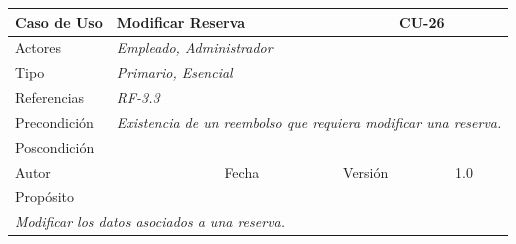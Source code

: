 \begin{table}[H]
    \begin{tabular}{|llllllll|}
    \hline
    \multicolumn{1}{|l|}{Caso de Uso}       & \multicolumn{5}{l|}{Modificar Reserva}                                                                          & \multicolumn{2}{l|}{\cellcolor[HTML]{E6E6E6}CU-26}          \\ \hline
    \multicolumn{1}{|l|}{Actores}           & \multicolumn{7}{l|}{{\color[HTML]{808080} \textit{Empleado, Administrador}}}                                                                                                                           \\ \hline
    \multicolumn{1}{|l|}{Tipo}              & \multicolumn{7}{l|}{{\color[HTML]{808080} \textit{Primario, Esencial}}}                                                                                                                \\ \hline
    \multicolumn{1}{|l|}{Referencias}       & \multicolumn{2}{l|}{{\color[HTML]{808080} \textit{RF-3.3}}}              & \multicolumn{5}{l|}{}                                                                                       \\ \hline
    \multicolumn{1}{|l|}{Precondición}      & \multicolumn{7}{l|}{{\color[HTML]{808080} \textit{Existencia de un reembolso que requiera modificar una reserva.}}}                                                                                                \\ \hline
    \multicolumn{1}{|l|}{Poscondición}      & \multicolumn{7}{l|}{}                                                                                                                                                                  \\ \hline
    \multicolumn{1}{|l|}{Autor}             & \multicolumn{1}{l|}{}                        & \multicolumn{2}{l|}{Fecha}           & \multicolumn{1}{l|}{}     & \multicolumn{2}{l|}{Versión}         & 1.0                           \\ \hline
    \multicolumn{8}{|l|}{\cellcolor[HTML]{F2F2F2}Propósito}                                                                                                                                                                          \\ \hline
    \multicolumn{8}{|p{15cm}|}{{\color[HTML]{808080} \textit{Modificar los datos asociados a una reserva.}}}                                                                                                           \\ \hline

\end{tabular}
\end{table}
